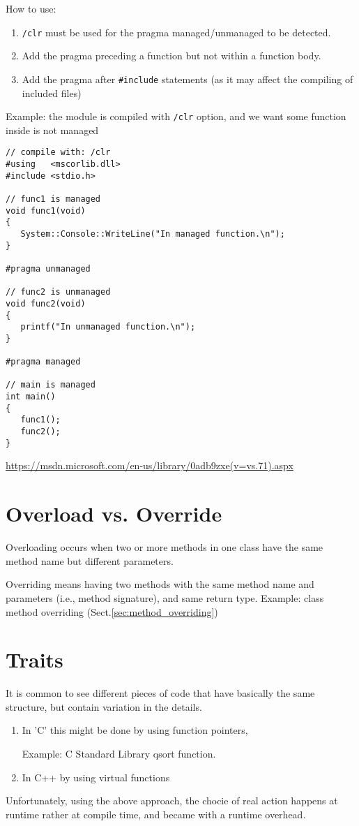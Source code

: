 How to use:
\begin{enumerate}
  \item \verb!/clr! must be used for the pragma managed/unmanaged to be detected.
  \item Add the pragma preceding a function but not within a function body.
  \item Add the pragma after \verb!#include! statements (as it may affect the compiling of included files)
\end{enumerate}

Example: the module is compiled with \verb!/clr! option, and we want some function inside is not managed
\begin{verbatim}
// compile with: /clr
#using   <mscorlib.dll>
#include <stdio.h>

// func1 is managed
void func1(void)
{
   System::Console::WriteLine("In managed function.\n");
}

#pragma unmanaged

// func2 is unmanaged
void func2(void)
{
   printf("In unmanaged function.\n");
}

#pragma managed

// main is managed
int main()
{
   func1();
   func2();
}
\end{verbatim}
\url{https://msdn.microsoft.com/en-us/library/0adb9zxe(v=vs.71).aspx}


\section{Overload vs. Override}
\label{sec:override}
\label{sec:overload}

Overloading occurs when two or more methods in one class have the same method
name but different parameters.

Overriding means having two methods with the same method name and parameters
(i.e., method signature), and same return type.
Example: class method overriding (Sect.\ref{sec:method_overriding})


\section{Traits}

It is common to see different pieces of code that have basically the same
structure, but contain variation in the details.
\begin{enumerate}
  
  \item  In 'C' this might be done by using function pointers, 
  
  Example: C Standard Library qsort function.
  
  \item  In C++ by using virtual functions
\end{enumerate}
Unfortunately, using the above approach, the chocie of real action happens at runtime rather at compile time, and became
with a runtime overhead.

